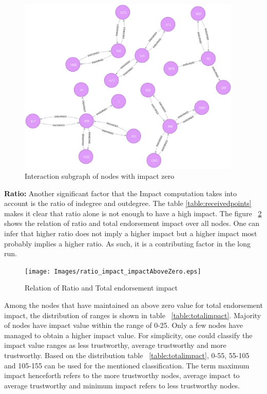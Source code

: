 \begin{figure}
	\includegraphics[width=0.95\textwidth]{Images/nodesWithImpactZero.eps}
	\caption{Interaction subgraph of nodes with impact zero}
	\label{fig:zeroimpact}
\end{figure}
\textbf{Ratio:}
Another significant factor that the Impact computation takes into account is
the ratio of indegree and outdegree. The table \ref{table:receivedpoints} makes
it clear that ratio alone is not enough to have a high impact. The figure
~\ref{fig:ratioimpact} shows the relation of ratio and total endorsement impact
over all nodes. One can infer that higher ratio does not imply a higher impact
but a higher impact most probably implies a higher ratio. As such, it is a
contributing factor in the long run. 
\begin{figure}[h]
	\texttt{[image: Images/ratio\_impact\_impactAboveZero.eps]}
	\caption{Relation of Ratio and Total endorsement impact}
	\label{fig:ratioimpact}
\end{figure}
Among the nodes that have maintained an above zero value for total endorsement
impact, the distribution of ranges is shown in table ~\ref{table:totalimpact}.
Majority of nodes have impact value within the range of 0-25. Only a few nodes
have managed to obtain a higher impact value.  For simplicity, one could
classify the impact value ranges as less trustworthy, average trustworthy and
more trustworthy. Based on the distribution table ~\ref{table:totalimpact},
0-55, 55-105 and 105-155 can be used for the mentioned classification. The term
maximum impact henceforth refers to the more trustworthy nodes, average impact
to average trustworthy and minimum impact refers to less trustworthy nodes. 


